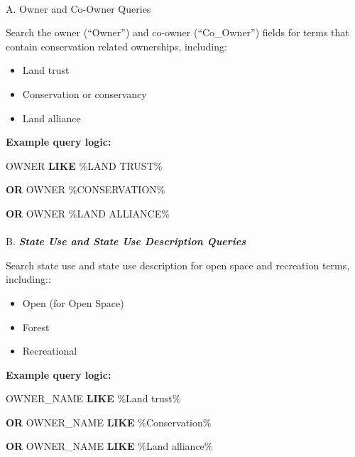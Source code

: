 \documentclass[
  letterpaper,
  DIV=11,
  numbers=noendperiod]{scrreprt}
\makeatletter
\let\oldparagraph\paragraph
\renewcommand{\paragraph}{
    \@ifstar
      \xxxParagraphStar
      \xxxParagraphNoStar
  }
\newcommand{\xxxParagraphStar}[1]{\oldparagraph*{#1}\mbox{}}
\newcommand{\xxxParagraphNoStar}[1]{\oldparagraph{#1}\mbox{}}
\newenvironment{Shaded}{\begin{snugshade}}{\end{snugshade}}
\newcommand{\KeywordTok}[1]{\textcolor[rgb]{0.00,0.23,0.31}{\textbf{#1}}}
\newcommand{\NormalTok}[1]{\textcolor[rgb]{0.00,0.23,0.31}{#1}}
\newcommand{\StringTok}[1]{\textcolor[rgb]{0.13,0.47,0.30}{#1}}
\providecommand{\tightlist}{%
  \setlength{\itemsep}{0pt}\setlength{\parskip}{0pt}}
\makeatother
\begin{document}
\paragraph{A. Owner and Co-Owner
Queries}\label{a.-owner-and-co-owner-queries}

Search the owner (``Owner'') and co-owner (``Co\_Owner'') fields for
terms that contain conservation related ownerships, including:

\begin{itemize}
\tightlist
\item
  Land trust
\item
  Conservation or conservancy
\item
  Land alliance
\end{itemize}

\textbf{Example query logic:}

\begin{Shaded}
\begin{Highlighting}[]
\NormalTok{OWNER }\KeywordTok{LIKE} \StringTok{\textquotesingle{}\%LAND TRUST\%\textquotesingle{}}
    
\KeywordTok{OR}\NormalTok{ OWNER }\StringTok{\textquotesingle{}\%CONSERVATION\%\textquotesingle{}}

\KeywordTok{OR}\NormalTok{ OWNER }\StringTok{\textquotesingle{}\%LAND ALLIANCE\%\textquotesingle{}}
\end{Highlighting}
\end{Shaded}

\paragraph{\texorpdfstring{B. \textbf{\emph{State Use and State Use
Description
Queries}}}{B. State Use and State Use Description Queries}}\label{b.-state-use-and-state-use-description-queries-1}

Search state use and state use description for open space and recreation
terms, including::

\begin{itemize}
\tightlist
\item
  Open (for Open Space)
\item
  Forest
\item
  Recreational
\end{itemize}

\textbf{Example query logic:}

\begin{Shaded}
\begin{Highlighting}[]
\NormalTok{OWNER\_NAME }\KeywordTok{LIKE} \StringTok{\textquotesingle{}\%Land trust\%\textquotesingle{}}

\KeywordTok{OR}\NormalTok{ OWNER\_NAME }\KeywordTok{LIKE} \StringTok{\textquotesingle{}\%Conservation\%\textquotesingle{}}

\KeywordTok{OR}\NormalTok{ OWNER\_NAME }\KeywordTok{LIKE} \StringTok{\textquotesingle{}\%Land alliance\%\textquotesingle{}}
\end{Highlighting}
\end{Shaded}
\end{document}
